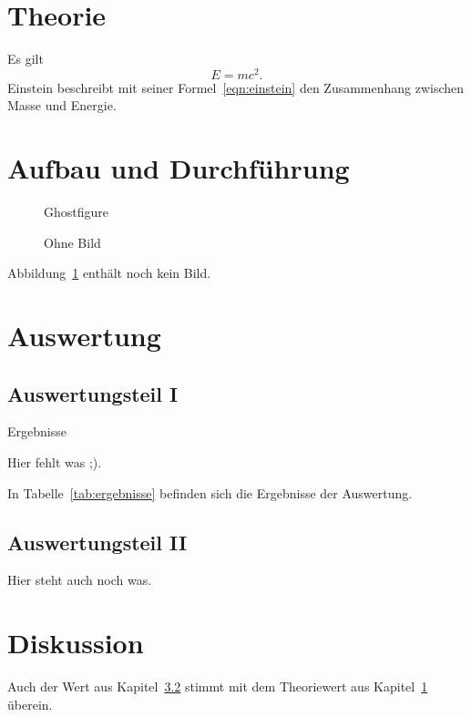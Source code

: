 \documentclass[
  captions=tableheading,
]{scrartcl}
\begin{document}
\section{Theorie} \label{sec:Theorie}

Es gilt
\begin{equation}
  E = mc^2 . \label{eqn:einstein}
\end{equation}
Einstein beschreibt mit seiner Formel~\eqref{eqn:einstein} den Zusammenhang zwischen Masse und Energie.

\section{Aufbau und Durchführung}

\begin{figure}
  \centering
  Ghostfigure
  \caption{Ohne Bild}
  \label{fig:nofigure}
\end{figure}
Abbildung~\ref{fig:nofigure} enthält noch kein Bild.

\section{Auswertung}

\subsection{Auswertungsteil I}

\begin{table}
  \centering
  \caption{Ergebnisse}
  \label{tab:ergebnisse}
  Hier fehlt was ;).
\end{table}
In Tabelle~\ref{tab:ergebnisse} befinden sich die Ergebnisse der Auswertung.

\subsection{Auswertungsteil II} \label{sec:auswertung2}

Hier steht auch noch was.

\section{Diskussion}

Auch der Wert aus Kapitel~\ref{sec:auswertung2} stimmt mit dem Theoriewert aus Kapitel~\ref{sec:Theorie} überein.
\end{document}
